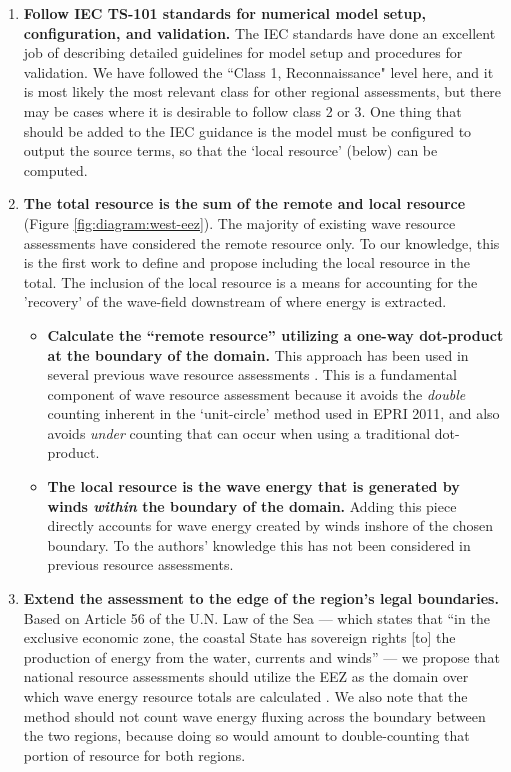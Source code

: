 \begin{enumerate}
\item {\bf Follow IEC TS-101 standards for numerical model setup, configuration, and validation.} The IEC standards have done an excellent job of describing detailed guidelines for model setup and procedures for validation. We have followed the ``Class 1, Reconnaissance" level here, and it is most likely the most relevant class for other regional assessments, but there may be cases where it is desirable to follow class 2 or 3. One thing that should be added to the IEC guidance is the model must be configured to output the source terms, so that the `local resource' (below) can be computed.
\item {\bf The total resource is the sum of the remote and local resource} (Figure \ref{fig:diagram:west-eez}). The majority of existing wave resource assessments have considered the remote resource only. To our knowledge, this is the first work to define and propose including the local resource in the total. The inclusion of the local resource is a means for accounting for the 'recovery' of the wave-field downstream of where energy is extracted.
\begin{itemize}
    \item {\bf Calculate the ``remote resource'' utilizing a one-way dot-product at the boundary of the domain.} This approach has been used in several previous wave resource assessments \citep{gunnQuantifyingGlobalWave2012, hemerRevisedAssessmentAustralia2017}. This is a fundamental component of wave resource assessment because it avoids the {\em double} counting inherent in the `unit-circle' method used in EPRI 2011, and also avoids {\em under} counting that can occur when using a traditional dot-product.
    \item {\bf The local resource is the wave energy that is generated by winds \textit{within} the boundary of the domain.} Adding this piece directly accounts for wave energy created by winds inshore of the chosen boundary. To the authors' knowledge this has not been considered in previous resource assessments.
\end{itemize}
\item {\bf Extend the assessment to the edge of the region's legal boundaries.} Based on Article 56 of the U.N. Law of the Sea — which states that ``in the exclusive economic zone, the coastal State has sovereign rights [to] the production of energy from the water, currents and winds'' — we propose that national resource assessments should utilize the EEZ as the domain over which wave energy resource totals are calculated \citep{unitednationsgeneralassemblyConventionLawSea1982}. We also note that the method should not count wave energy fluxing across the boundary between the two regions, because doing so would amount to double-counting that portion of resource for both regions.
\end{enumerate}

